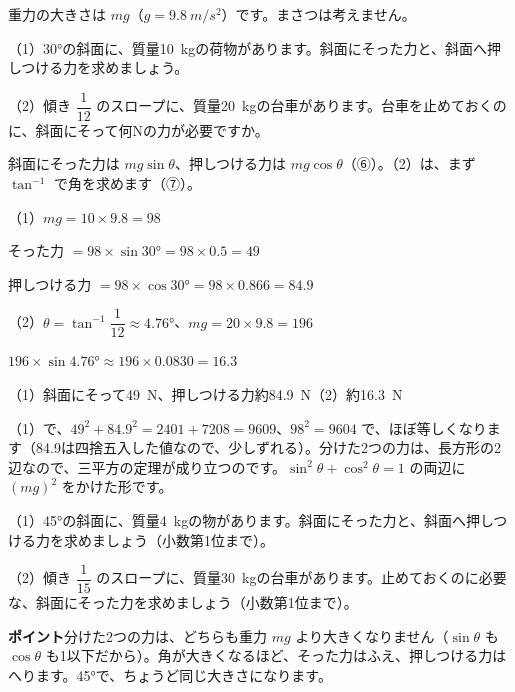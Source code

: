 \begin{reidai}
重力の大きさは $mg$（$g=\qty{9.8}{m/s^2}$）です。まさつは考えません。\par
（1）\ang{30}の斜面に、質量\qty{10}{kg}の荷物があります。斜面にそった力と、斜面へ押しつける力を求めましょう。\par
（2）傾き $\dfrac{1}{12}$ のスロープに、質量\qty{20}{kg}の台車があります。台車を止めておくのに、斜面にそって何Nの力が必要ですか。\par
\kangaekata 斜面にそった力は $mg\sin\theta$、押しつける力は $mg\cos\theta$（⑥）。（2）は、まず $\tan^{-1}$ で角を求めます（⑦）。\par
\shiki（1）$mg=10\times9.8=98$\par
\hspace*{4.6\zw}そった力 $=98\times\sin\ang{30}=98\times0.5=49$\par
\hspace*{4.6\zw}押しつける力 $=98\times\cos\ang{30}=98\times0.866=84.9$\par
\hspace*{2.6\zw}（2）$\theta=\tan^{-1}\dfrac{1}{12}\approx\ang{4.76}$、$mg=20\times9.8=196$\par
\hspace*{4.6\zw}$196\times\sin\ang{4.76}\approx196\times0.0830=16.3$\par
\kotae （1）斜面にそって\qty{49}{N}、押しつける力約\qty{84.9}{N}\quad（2）約\qty{16.3}{N}
\end{reidai}
（1）で、$49^2+84.9^2=2401+7208=9609$、$98^2=9604$ で、ほぼ等しくなります（84.9は四捨五入した値なので、少しずれる）。分けた2つの力は、長方形の2辺なので、三平方の定理が成り立つのです。$\sin^2\theta+\cos^2\theta=1$ の両辺に $(mg)^2$ をかけた形です。

\begin{jibun}
（1）\ang{45}の斜面に、質量\qty{4}{kg}の物があります。斜面にそった力と、斜面へ押しつける力を求めましょう（小数第1位まで）。\par
（2）傾き $\dfrac{1}{15}$ のスロープに、質量\qty{30}{kg}の台車があります。止めておくのに必要な、斜面にそった力を求めましょう（小数第1位まで）。
\end{jibun}
\textbf{ポイント}\quad 分けた2つの力は、どちらも重力 $mg$ より大きくなりません（$\sin\theta$ も $\cos\theta$ も1以下だから）。角が大きくなるほど、そった力はふえ、押しつける力はへります。\ang{45}で、ちょうど同じ大きさになります。

